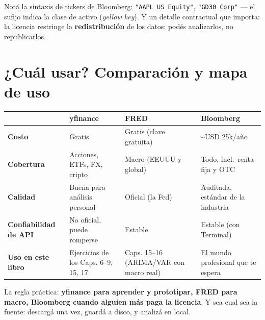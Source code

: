\documentclass[
  spanish,
  letterpaper,
  DIV=11,
  numbers=noendperiod]{scrreprt}
\begin{document}
Notá la sintaxis de tickers de Bloomberg: \texttt{"AAPL\ US\ Equity"},
\texttt{"GD30\ Corp"} --- el sufijo indica la clase de activo
(\emph{yellow key}). Y un detalle contractual que importa: la licencia
restringe la \textbf{redistribución} de los datos; podés analizarlos, no
republicarlos.

\section{¿Cuál usar? Comparación y mapa de
uso}\label{cuuxe1l-usar-comparaciuxf3n-y-mapa-de-uso}

\begin{longtable}[]{@{}
  >{\raggedright\arraybackslash}p{}
  >{\raggedright\arraybackslash}p{}
  >{\raggedright\arraybackslash}p{}
  >{\raggedright\arraybackslash}p{}@{}}
\toprule\noalign{}
\begin{minipage}[b]{\linewidth}\raggedright
\end{minipage} & \begin{minipage}[b]{\linewidth}\raggedright
\textbf{yfinance}
\end{minipage} & \begin{minipage}[b]{\linewidth}\raggedright
\textbf{FRED}
\end{minipage} & \begin{minipage}[b]{\linewidth}\raggedright
\textbf{Bloomberg}
\end{minipage} \\
\midrule\noalign{}
\endhead
\bottomrule\noalign{}
\endlastfoot
\textbf{Costo} & Gratis & Gratis (clave gratuita) & \textasciitilde USD
25k/año \\
\textbf{Cobertura} & Acciones, ETFs, FX, cripto & Macro (EEUUU y global)
& Todo, incl.~renta fija y OTC \\
\textbf{Calidad} & Buena para análisis personal & Oficial (la Fed) &
Auditada, estándar de la industria \\
\textbf{Confiabilidad de API} & No oficial, puede romperse & Estable &
Estable (con Terminal) \\
\textbf{Uso en este libro} & Ejercicios de los Caps. 6--9, 15, 17 &
Caps. 15--16 (ARIMA/VAR con macro real) & El mundo profesional que te
espera \\
\end{longtable}

La regla práctica: \textbf{yfinance para aprender y prototipar, FRED
para macro, Bloomberg cuando alguien más paga la licencia}. Y sea cual
sea la fuente: descargá una vez, guardá a disco, y analizá en local.
\end{document}
